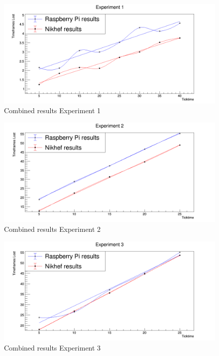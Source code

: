 \begin{figure}[!htbp]
	\centering
	\includegraphics[width=\textwidth,height=\textheight,keepaspectratio]{./graphics/ex1_combined.png}
	\caption{Combined results Experiment 1}
	\label{fig:Ex1Combined}
\end{figure}
\begin{figure}[!htbp]
	\centering
	\includegraphics[width=\textwidth,height=\textheight,keepaspectratio]{./graphics/ex2_combined.png}
	\caption{Combined results Experiment 2}
	\label{fig:Ex2Combined}
\end{figure}
\begin{figure}[!htbp]
	\centering
	\includegraphics[width=\textwidth,height=\textheight,keepaspectratio]{./graphics/ex3_combined.png}
	\caption{Combined results Experiment 3}
	\label{fig:Ex3Combined}
\end{figure}

